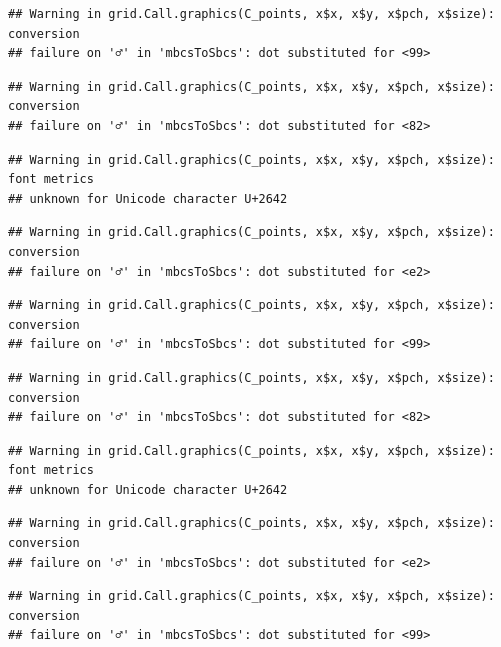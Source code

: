 \documentclass[
]{book}
\begin{document}
\begin{verbatim}
## Warning in grid.Call.graphics(C_points, x$x, x$y, x$pch, x$size): conversion
## failure on '♂' in 'mbcsToSbcs': dot substituted for <99>
\end{verbatim}

\begin{verbatim}
## Warning in grid.Call.graphics(C_points, x$x, x$y, x$pch, x$size): conversion
## failure on '♂' in 'mbcsToSbcs': dot substituted for <82>
\end{verbatim}

\begin{verbatim}
## Warning in grid.Call.graphics(C_points, x$x, x$y, x$pch, x$size): font metrics
## unknown for Unicode character U+2642
\end{verbatim}

\begin{verbatim}
## Warning in grid.Call.graphics(C_points, x$x, x$y, x$pch, x$size): conversion
## failure on '♂' in 'mbcsToSbcs': dot substituted for <e2>
\end{verbatim}

\begin{verbatim}
## Warning in grid.Call.graphics(C_points, x$x, x$y, x$pch, x$size): conversion
## failure on '♂' in 'mbcsToSbcs': dot substituted for <99>
\end{verbatim}

\begin{verbatim}
## Warning in grid.Call.graphics(C_points, x$x, x$y, x$pch, x$size): conversion
## failure on '♂' in 'mbcsToSbcs': dot substituted for <82>
\end{verbatim}

\begin{verbatim}
## Warning in grid.Call.graphics(C_points, x$x, x$y, x$pch, x$size): font metrics
## unknown for Unicode character U+2642
\end{verbatim}

\begin{verbatim}
## Warning in grid.Call.graphics(C_points, x$x, x$y, x$pch, x$size): conversion
## failure on '♂' in 'mbcsToSbcs': dot substituted for <e2>
\end{verbatim}

\begin{verbatim}
## Warning in grid.Call.graphics(C_points, x$x, x$y, x$pch, x$size): conversion
## failure on '♂' in 'mbcsToSbcs': dot substituted for <99>
\end{verbatim}
\end{document}
